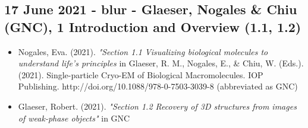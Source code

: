 \documentclass[11pt, oneside]{article}   	%
\begin{document}
\pagebreak

\subsection{17 June 2021 - blur - Glaeser, Nogales \& Chiu (GNC), 1 Introduction and Overview (1.1, 1.2)}
\begin{itemize}
	\item Nogales, Eva. (2021). {\it "Section 1.1 Visualizing biological molecules to understand life's principles} in Glaeser, R. M., Nogales, E., \& Chiu, W. (Eds.). (2021). Single-particle Cryo-EM of Biological Macromolecules. IOP Publishing. http://doi.org/10.1088/978-0-7503-3039-8 (abbreviated as GNC)
	\item Glaeser, Robert. (2021). {\it "Section 1.2 Recovery of 3D structures from images of weak-phase objects"} in GNC
\end{itemize}
\end{document}
